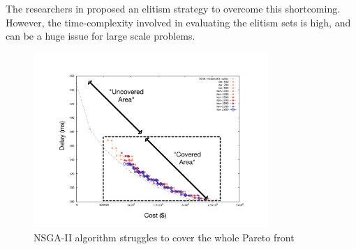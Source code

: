 \documentclass[10pt,journal,compsoc]{IEEEtran}
\begin{document}

The researchers in \cite{doi:10.1163/156939308784160703} proposed an elitism strategy to overcome this shortcoming. However, the time-complexity involved in evaluating the elitism sets is high, and can be a huge issue for large scale problems.

\begin{figure}[ht]
\centerline{\includegraphics[page=1,width=3.5in]{nsgaitertest_label.pdf}}
\caption{NSGA-II algorithm struggles to cover the whole Pareto front} 
\label{nsgalabel}
\end{figure} 
\end{document}
